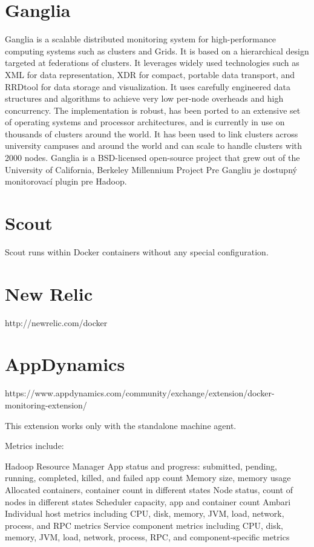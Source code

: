 \documentclass[11pt,final,oneside]{fithesis}
\begin{document}
\section{Ganglia} 
Ganglia is a scalable distributed monitoring system for high-performance computing systems such as clusters and Grids. It is based on a hierarchical design targeted at federations of clusters. It leverages widely used technologies such as XML for data representation, XDR for compact, portable data transport, and RRDtool for data storage and visualization. It uses carefully engineered data structures and algorithms to achieve very low per-node overheads and high concurrency. The implementation is robust, has been ported to an extensive set of operating systems and processor architectures, and is currently in use on thousands of clusters around the world. It has been used to link clusters across university campuses and around the world and can scale to handle clusters with 2000 nodes.
Ganglia is a BSD-licensed open-source project that grew out of the University of California, Berkeley Millennium Project
\cite{15}
Pre Gangliu je dostupný monitorovací plugin pre Hadoop.
\cite{16}


\section{Scout}
Scout runs within Docker containers without any special configuration. \cite{scout}

\section{New Relic}
http://newrelic.com/docker

\section{AppDynamics}
https://www.appdynamics.com/community/exchange/extension/docker-monitoring-extension/

This extension works only with the standalone machine agent.


Metrics include:

Hadoop Resource Manager
App status and progress: submitted, pending, running, completed, killed, and failed app count
Memory size, memory usage
Allocated containers, container count in different states
Node status, count of nodes in different states
Scheduler capacity, app and container count
Ambari
Individual host metrics including CPU, disk, memory, JVM, load, network, process, and RPC metrics
Service component metrics including CPU, disk, memory, JVM, load, network, process, RPC, and component-specific metrics
\cite{17}
\end{document}
